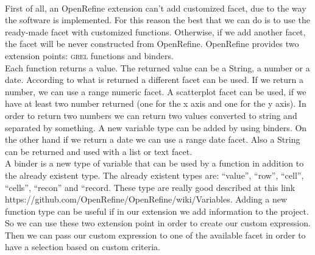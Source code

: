 \paragraph{} First of all, an OpenRefine extension can't add customized facet, due to the way the software is implemented. For this reason the best that we can do is to use the ready-made facet with customized functions. Otherwise, if we add another facet, the facet will be never constructed from OpenRefine. OpenRefine provides two extension points: \textsc{grel} functions and binders. \\
Each function returns a value. The returned value can be a String, a number or a date. According to what is returned a different facet can be used. If we return a number, we can use a range numeric facet. A scatterplot facet can be used, if we have at least two number returned (one for the x axis and one for the y axis). In order to return two numbers we can return two values converted to string and separated by something. A new variable type can be added by using binders. On the other hand if we return a date we can use a range date facet. Also a String can be returned and used with a list or text facet. \\
A binder is a new type of variable that can be used by a function in addition to the already existent type. The already existent types are: ``value'', ``row'', ``cell'', ``cells'', ``recon'' and ``record. These type are really good described at this link https://github.com/OpenRefine/OpenRefine/wiki/Variables. Adding a new function type can be useful if in our extension we add information to the project. \\
So we can use these two extension point in order to create our custom expression. Then we can pass our custom expression to one of the available facet in order to have a selection based on custom criteria.

